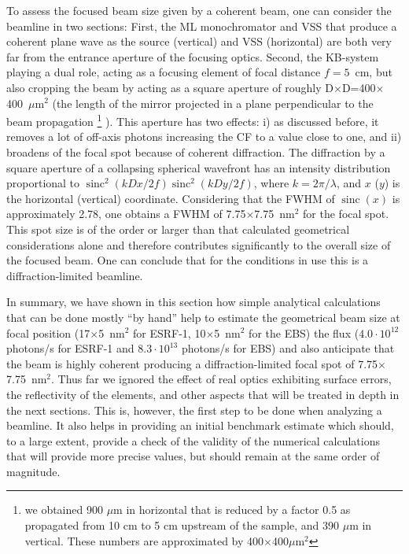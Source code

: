 \documentclass{iucr}              %
\newcommand{\inred}[1]{{\color{black}#1}}
\DeclareMathOperator{\sinc}{sinc}
\begin{document}
To assess the focused beam size given by a coherent beam, one can consider the beamline in two sections: First, the ML monochromator and VSS that produce a coherent plane wave as the source (vertical) and VSS (horizontal) are both very far from the entrance aperture of the focusing optics. Second, the KB-system playing a dual role, acting as a focusing element of focal distance $f=5$~cm, but also cropping the beam by acting as a square aperture of roughly D$\times$D=400$\times$400~$\mu$m$^2$ (the length of the mirror projected in a plane perpendicular to the beam propagation
\footnote{\inred{we obtained 900 $\mu$m in horizontal that is reduced by a factor 0.5 as propagated from 10 cm to 5 cm upstream of the sample, and 390 $\mu$m in vertical. These numbers are approximated by 400$\times$400$\mu$m$^2$ }}
).
This aperture has two effects: i) as discussed before, it removes a lot of off-axis photons increasing the CF to a value close to one, and ii) broadens of the focal spot because of coherent diffraction. The diffraction by a square aperture of a collapsing spherical wavefront has an intensity distribution proportional to $\sinc^2(k D x/2 f) \sinc^2(k D y / 2 f)$,
where $k=2\pi/\lambda$, and $x$ ($y$) is the horizontal (vertical) coordinate. Considering that the FWHM of $\sinc(x)$ is approximately 2.78, one obtains a FWHM of 7.75$\times$7.75~nm$^2$ for the focal spot. This spot size is of the order or larger than that calculated geometrical considerations alone and therefore contributes significantly to the overall size of the focused beam. One can conclude that for the conditions in use this is a diffraction-limited beamline. 


In summary, we have shown in this section how simple analytical calculations that can be done mostly ``by hand'' help to estimate the geometrical beam size at focal position (17$\times$5~nm$^2$ for ESRF-1, 10$\times$5~nm$^2$ for the EBS) the flux ($4.0\cdot10^{12}$ photons/s for ESRF-1 and $8.3\cdot10^{13}$ photons/s for EBS) and also anticipate that the beam is highly coherent producing a diffraction-limited focal spot of  7.75$\times$7.75~nm$^2$. Thus far we ignored the effect of real optics exhibiting surface errors, the reflectivity of the elements, and other aspects that will be treated in depth in the next sections. This is, however, the first step to be done when analyzing a beamline. It also helps in providing an initial benchmark estimate which should, to a large extent, provide a check of the validity of the numerical calculations that will provide more precise values, but should remain at the same order of magnitude.  
\end{document}
